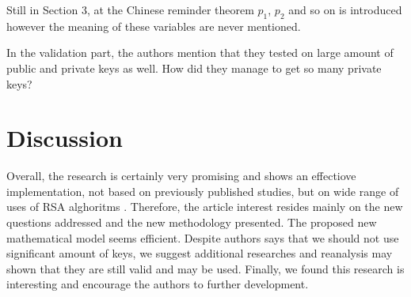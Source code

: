 \documentclass[11 pt,a4paper,english]{article}
\begin{document}
Still in Section 3, at the Chinese reminder theorem $p_1$, $p_2$ and so on is introduced however the meaning of these variables are never mentioned.

In the validation part, the authors mention that they tested on large amount of public and private keys as well. How did they manage to get so many private keys?  


\section{Discussion}
Overall, the research is certainly very promising and shows an effectiove implementation, not based on previously published studies, but on wide range of uses of RSA alghoritms \cite{10.1145/359340.359342}.
Therefore, the article interest resides mainly on the new questions addressed and the new methodology presented. The proposed new mathematical model seems efficient. Despite authors says that we should not use significant amount of keys, we suggest additional researches and reanalysis may shown that they are still valid and may be used.
Finally, we found this research is interesting and encourage the authors to further development.




\newpage
{}

\end{document}
